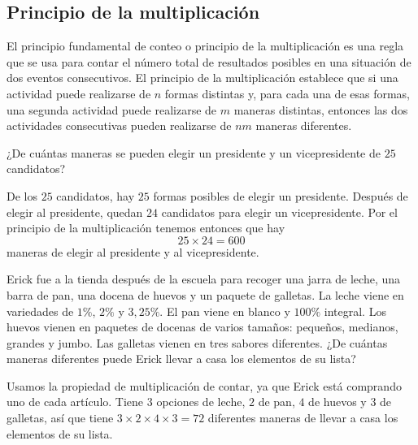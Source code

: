 \subsection{Principio de la multiplicación}
\begin{definicion}
    El principio fundamental de conteo o principio de la multiplicación es una regla que se usa para contar el número total de resultados posibles en una situación de dos eventos consecutivos. El principio de la multiplicación establece que si una actividad puede realizarse de $n$ formas distintas y, para cada una de esas formas, una segunda actividad puede realizarse de $m$ maneras distintas, entonces las dos actividades consecutivas pueden realizarse de $nm$ maneras diferentes. 
\end{definicion}

\begin{ejemplo}
    ¿De cuántas maneras se pueden elegir un presidente y un vicepresidente de $25$ candidatos?
\end{ejemplo}

\begin{solucion}
De los $25$ candidatos, hay $25$ formas posibles de elegir un presidente. Después de elegir al presidente, quedan $24$ candidatos para elegir un vicepresidente. Por el principio de la multiplicación tenemos entonces que hay
\[25\times 24=600\]
maneras de elegir al presidente y al vicepresidente.
\end{solucion}

\begin{ejemplo}
    Erick fue a la tienda después de la escuela para recoger una jarra de leche, una barra de pan, una docena de huevos y un paquete de galletas. La leche viene en variedades de $1\%$, $2\%$ y $3,25\%$. El pan viene en blanco y $100\%$ integral. Los huevos vienen en paquetes de docenas de varios tamaños: pequeños, medianos, grandes y jumbo. Las galletas vienen en tres sabores diferentes. ¿De cuántas maneras diferentes puede Erick llevar a casa los elementos de su lista?
\end{ejemplo}

\begin{solucion}
Usamos la propiedad de multiplicación de contar, ya que Erick está comprando uno de cada artículo. Tiene $3$ opciones de leche, $2$ de pan, $4$ de huevos y $3$ de galletas, así que tiene $3\times 2 \times 4 \times 3=72$ diferentes maneras de llevar a casa los elementos de su lista.
\end{solucion}

